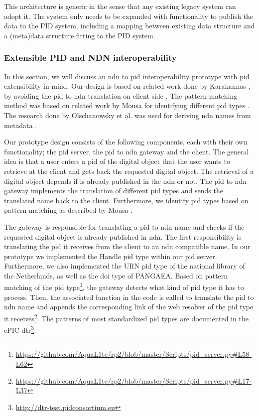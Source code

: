 \documentclass[conference]{IEEEtran}
\begin{document}
This architecture is generic in the sense that any existing legacy system can adopt it. The system only needs to be expanded with functionality to publish the data to the PID system, including a mapping between existing data structure and a (meta)data structure fitting to the PID system.

\subsubsection{Extensible PID and NDN interoperability}
\label{interoperablity}
In this section, we will discuss an \gls{ndn} to \gls{pid} interoperability prototype with \gls{pid} extensibility in mind. Our design is based on related work done by Karakannas \cite{icn-bd}, by avoiding the \gls{pid} to \gls{ndn} translation on client side \cite{icn-bd}. The pattern matching method was based on related work by Mousa for identifying different \gls{pid} types \cite{ndn-app-aware}. The research done by Olschanowsky et al. was used for deriving \gls{ndn} names from metadata \cite{ndn-man}.

Our prototype design consists of the following components, each with their own functionality; the \gls{pid} server, the \gls{pid} to \gls{ndn} gateway and the client. The general idea is that a user enters a \gls{pid} of the digital object that the user wants to retrieve at the client and gets back the requested digital object. The retrieval of a digital object depends if is already published in the \gls{ndn} or not. The \gls{pid} to \gls{ndn} gateway implements the translation of different \gls{pid} types and sends the translated name back to the client. Furthermore, we identify \gls{pid} types based on pattern matching as described by Mousa \cite{ndn-app-aware}.

The gateway is responsible for translating a \gls{pid} to \gls{ndn} name and checks if the requested digital object is already published in \gls{ndn}. The first responsibility is translating the \gls{pid} it receives from the client to an \gls{ndn} compatible name. In our prototype we implemented the Handle \gls{pid} type within our \gls{pid} server. Furthermore, we also implemented the URN \gls{pid} type of the national library of the Netherlands, as well as the \gls{doi} type of PANGAEA. Based on pattern matching of the \gls{pid} type\footnote{\url{https://github.com/AquaL1te/rp2/blob/master/Scripts/pid_server.py#L58-L62}}, the gateway detects what kind of \gls{pid} type it has to process. Then, the associated function in the code is called to translate the \gls{pid} to \gls{ndn} name and appends the corresponding link of the web resolver of the \gls{pid} type it receives\footnote{\url{https://github.com/AquaL1te/rp2/blob/master/Scripts/pid_server.py#L17-L37}}. The patterns of most standardized \gls{pid} types are documented in the ePIC \gls{dtr}\footnote{\url{http://dtr-test.pidconsortium.eu}}.
\end{document}
